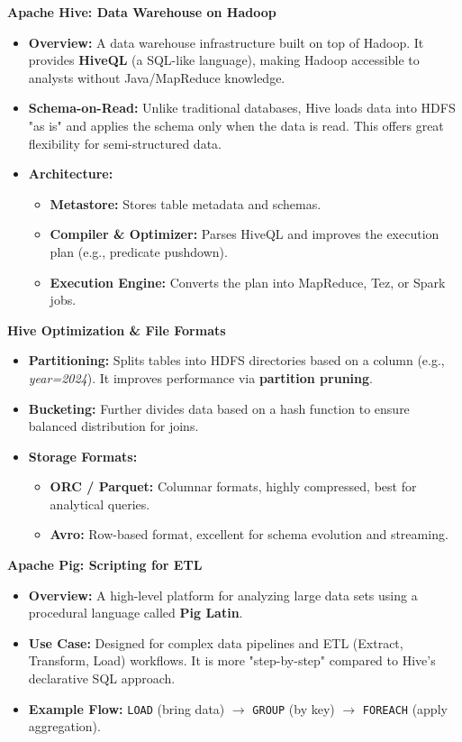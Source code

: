\textbf{Apache Hive: Data Warehouse on Hadoop}
\begin{itemize}
    \item \textbf{Overview:} A data warehouse infrastructure built on top of Hadoop. It provides \textbf{HiveQL} (a SQL-like language), making Hadoop accessible to analysts without Java/MapReduce knowledge.
    \item \textbf{Schema-on-Read:} Unlike traditional databases, Hive loads data into HDFS "as is" and applies the schema only when the data is read. This offers great flexibility for semi-structured data.
    
    
    
    \item \textbf{Architecture:}
    \begin{itemize}
        \item \textbf{Metastore:} Stores table metadata and schemas.
        \item \textbf{Compiler \& Optimizer:} Parses HiveQL and improves the execution plan (e.g., predicate pushdown).
        \item \textbf{Execution Engine:} Converts the plan into MapReduce, Tez, or Spark jobs.
    \end{itemize}
\end{itemize}

\textbf{Hive Optimization \& File Formats}
\begin{itemize}
    \item \textbf{Partitioning:} Splits tables into HDFS directories based on a column (e.g., \textit{year=2024}). It improves performance via \textbf{partition pruning}.
    \item \textbf{Bucketing:} Further divides data based on a hash function to ensure balanced distribution for joins.
    
    
    
    \item \textbf{Storage Formats:}
    \begin{itemize}
        \item \textbf{ORC / Parquet:} Columnar formats, highly compressed, best for analytical queries.
        \item \textbf{Avro:} Row-based format, excellent for schema evolution and streaming.
    \end{itemize}
\end{itemize}

\textbf{Apache Pig: Scripting for ETL}
\begin{itemize}
    \item \textbf{Overview:} A high-level platform for analyzing large data sets using a procedural language called \textbf{Pig Latin}.
    \item \textbf{Use Case:} Designed for complex data pipelines and ETL (Extract, Transform, Load) workflows. It is more "step-by-step" compared to Hive's declarative SQL approach.
    \item \textbf{Example Flow:} \texttt{LOAD} (bring data) $\rightarrow$ \texttt{GROUP} (by key) $\rightarrow$ \texttt{FOREACH} (apply aggregation).
\end{itemize}

